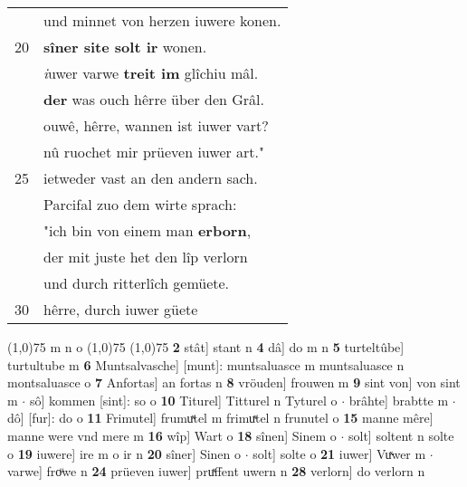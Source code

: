 \documentclass[8pt,a4paper,notitlepage]{article}
\begin{document}
\begin{table}[ht]
\begin{minipage}[t]{0.5\linewidth}
\begin{tabular}{rl}
 & und minnet von herzen iuwere konen.\\ 
20 & \textbf{sîner site solt ir} wonen.\\ 
 & \textit{i}uwer varwe \textbf{treit im} glîchiu mâl.\\ 
 & \textbf{der} was ouch hêrre über den Grâl.\\ 
 & ouwê, hêrre, wannen ist iuwer vart?\\ 
 & nû ruochet mir prüeven iuwer art."\\ 
25 & ietweder vast an den andern sach.\\ 
 & Parcifal zuo dem wirte sprach:\\ 
 & "ich bin von einem man \textbf{erborn},\\ 
 & der mit juste het den lîp verlorn\\ 
 & und durch ritterlîch gemüete.\\ 
30 & hêrre, durch iuwer güete\\ 
\end{tabular}
\scriptsize
\line(1,0){75} \newline
m n o \newline
\line(1,0){75} \newline
\newline
\line(1,0){75} \newline
\textbf{2} stât] stant n \textbf{4} dâ] do m n \textbf{5} turteltûbe] turtultube m \textbf{6} Muntsalvasche] [munt]: muntsaluasce m muntsaluasce n montsaluasce o \textbf{7} Anfortas] an fortas n \textbf{8} vröuden] frouwen m \textbf{9} sint von] von sint m  $\cdot$ sô] kommen [sint]: so o \textbf{10} Titurel] Titturel n Tyturel o  $\cdot$ brâhte] brabtte m  $\cdot$ dô] [fur]: do o \textbf{11} Frimutel] frumuͯtel m frimuͯtel n frunutel o \textbf{15} manne mêre] manne were vnd mere m \textbf{16} wîp] Wart o \textbf{18} sînen] Sinem o  $\cdot$ solt] soltent n solte o \textbf{19} iuwere] ire m o ir n \textbf{20} sîner] Sinen o  $\cdot$ solt] solte o \textbf{21} iuwer] Vuͯwer m  $\cdot$ varwe] froͧwe n \textbf{24} prüeven iuwer] pruͯffent uwern n \textbf{28} verlorn] do verlorn n \newline
\end{minipage}
\end{table}
\newpage
\end{document}
